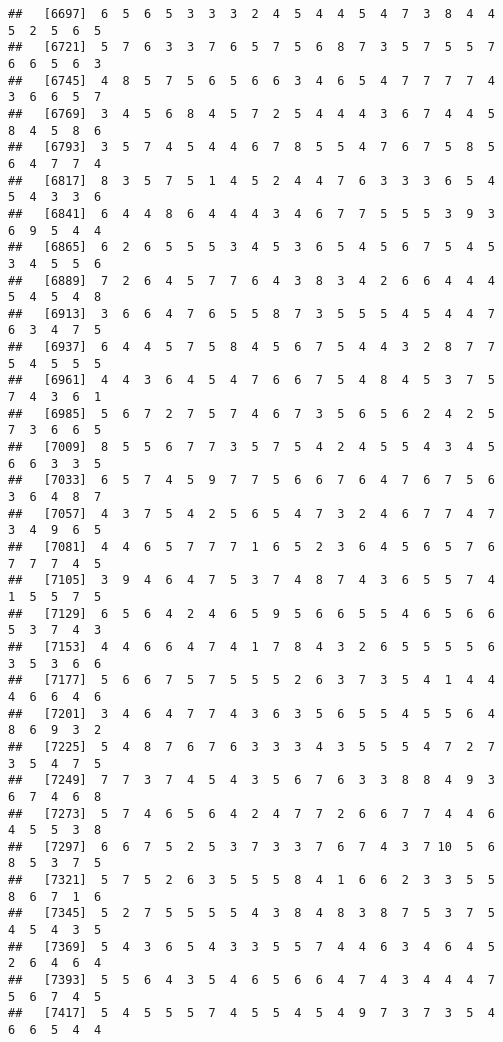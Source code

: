 \documentclass[
]{book}
\begin{document}
\begin{verbatim}
##   [6697]  6  5  6  5  3  3  3  2  4  5  4  4  5  4  7  3  8  4  4  5  2  5  6  5
##   [6721]  5  7  6  3  3  7  6  5  7  5  6  8  7  3  5  7  5  5  7  6  6  5  6  3
##   [6745]  4  8  5  7  5  6  5  6  6  3  4  6  5  4  7  7  7  7  4  3  6  6  5  7
##   [6769]  3  4  5  6  8  4  5  7  2  5  4  4  4  3  6  7  4  4  5  8  4  5  8  6
##   [6793]  3  5  7  4  5  4  4  6  7  8  5  5  4  7  6  7  5  8  5  6  4  7  7  4
##   [6817]  8  3  5  7  5  1  4  5  2  4  4  7  6  3  3  3  6  5  4  5  4  3  3  6
##   [6841]  6  4  4  8  6  4  4  4  3  4  6  7  7  5  5  5  3  9  3  6  9  5  4  4
##   [6865]  6  2  6  5  5  5  3  4  5  3  6  5  4  5  6  7  5  4  5  3  4  5  5  6
##   [6889]  7  2  6  4  5  7  7  6  4  3  8  3  4  2  6  6  4  4  4  5  4  5  4  8
##   [6913]  3  6  6  4  7  6  5  5  8  7  3  5  5  5  4  5  4  4  7  6  3  4  7  5
##   [6937]  6  4  4  5  7  5  8  4  5  6  7  5  4  4  3  2  8  7  7  5  4  5  5  5
##   [6961]  4  4  3  6  4  5  4  7  6  6  7  5  4  8  4  5  3  7  5  7  4  3  6  1
##   [6985]  5  6  7  2  7  5  7  4  6  7  3  5  6  5  6  2  4  2  5  7  3  6  6  5
##   [7009]  8  5  5  6  7  7  3  5  7  5  4  2  4  5  5  4  3  4  5  6  6  3  3  5
##   [7033]  6  5  7  4  5  9  7  7  5  6  6  7  6  4  7  6  7  5  6  3  6  4  8  7
##   [7057]  4  3  7  5  4  2  5  6  5  4  7  3  2  4  6  7  7  4  7  3  4  9  6  5
##   [7081]  4  4  6  5  7  7  7  1  6  5  2  3  6  4  5  6  5  7  6  7  7  7  4  5
##   [7105]  3  9  4  6  4  7  5  3  7  4  8  7  4  3  6  5  5  7  4  1  5  5  7  5
##   [7129]  6  5  6  4  2  4  6  5  9  5  6  6  5  5  4  6  5  6  6  5  3  7  4  3
##   [7153]  4  4  6  6  4  7  4  1  7  8  4  3  2  6  5  5  5  5  6  3  5  3  6  6
##   [7177]  5  6  6  7  5  7  5  5  5  2  6  3  7  3  5  4  1  4  4  4  6  6  4  6
##   [7201]  3  4  6  4  7  7  4  3  6  3  5  6  5  5  4  5  5  6  4  8  6  9  3  2
##   [7225]  5  4  8  7  6  7  6  3  3  3  4  3  5  5  5  4  7  2  7  3  5  4  7  5
##   [7249]  7  7  3  7  4  5  4  3  5  6  7  6  3  3  8  8  4  9  3  6  7  4  6  8
##   [7273]  5  7  4  6  5  6  4  2  4  7  7  2  6  6  7  7  4  4  6  4  5  5  3  8
##   [7297]  6  6  7  5  2  5  3  7  3  3  7  6  7  4  3  7 10  5  6  8  5  3  7  5
##   [7321]  5  7  5  2  6  3  5  5  5  8  4  1  6  6  2  3  3  5  5  8  6  7  1  6
##   [7345]  5  2  7  5  5  5  5  4  3  8  4  8  3  8  7  5  3  7  5  4  5  4  3  5
##   [7369]  5  4  3  6  5  4  3  3  5  5  7  4  4  6  3  4  6  4  5  2  6  4  6  4
##   [7393]  5  5  6  4  3  5  4  6  5  6  6  4  7  4  3  4  4  4  7  5  6  7  4  5
##   [7417]  5  4  5  5  5  7  4  5  5  4  5  4  9  7  3  7  3  5  4  6  6  5  4  4

\end{verbatim}
\end{document}
